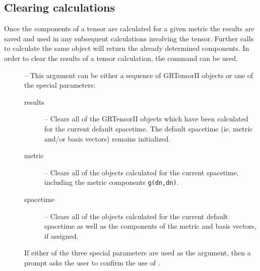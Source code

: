 \documentclass{article}
\begin{document}
\subsection{Clearing calculations} \label{sec:grclear}
%
Once the components of a tensor are calculated for a given metric the
results are saved and used in any subsequent calculations involving
the tensor. Further calls to calculate the same object will return
the already determined components.
In order to clear the results of a tensor calculation, the command
 can be used.\\
%
\begin{cmdspec}
  \label{spec:grclear}

  \begin{description}
    \item[] -- This argument can be either a sequence of
      GRTensorII objects or one of the special parameters:
      \begin{description}
        \item[results] -- Clears all of the
          GRTensorII objects which have been calculated for the
          current default spacetime. The default spacetime
          (ie. metric and/or basis vectors) remains initialized.
        \item[metric] -- Clears all of the
          objects calculated for the current spacetime, 
          including the metric components \texttt{g(dn,dn)}.
        \item[spacetime] -- Clears all of the objects
          calculated for the current default spacetime as well as
          the components of the metric and basis vectors, if assigned.
       \end{description}
       If either of the three special parameters are used as the 
        argument, then a prompt asks the user to confirm 
       the use of .
  \end{description}

\end{cmdspec}
\end{document}

